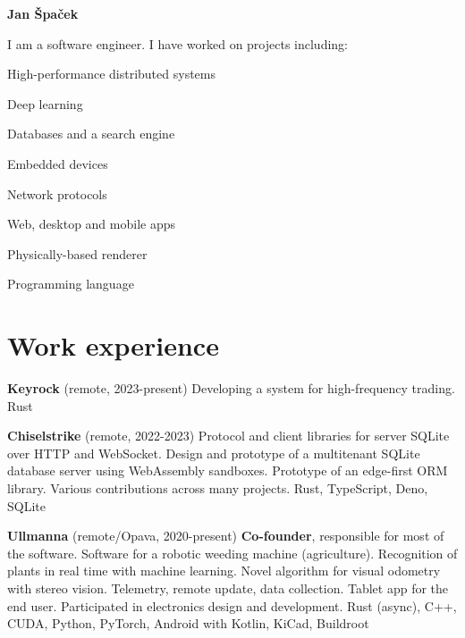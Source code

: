 \documentclass[10pt,a4paper]{article}
\begin{document}
\thispagestyle{empty}
\sffamily

{\bfseries\huge Jan Špaček}

\begin{multicols}{2}

I am a software engineer. I have worked on projects including:
\begin{compactitem}
  \item High-performance distributed systems
  \item Deep learning
  \item Databases and a search engine
  \item Embedded devices
  \item Network protocols
  \item Web, desktop and mobile apps
  \item Physically-based renderer
  \item Programming language
\end{compactitem}

\section*{Work experience}

\textbf{Keyrock} (remote, 2023-present)
  \newline Developing a system for high-frequency trading.
  \newline Rust

\textbf{Chiselstrike} (remote, 2022-2023)
  \newline Protocol and client libraries for server SQLite over HTTP and WebSocket.
  \newline Design and prototype of a multitenant SQLite database server using WebAssembly sandboxes.
  \newline Prototype of an edge-first ORM library.
  \newline Various contributions across many projects.
  \newline Rust, TypeScript, Deno, SQLite

\textbf{Ullmanna} (remote/Opava, 2020-present)
  \newline \textbf{Co-founder}, responsible for most of the software.
  \newline Software for a robotic weeding machine (agriculture).
  \newline Recognition of plants in real time with machine learning.
  \newline Novel algorithm for visual odometry with stereo vision.
  \newline Telemetry, remote update, data collection.
  \newline Tablet app for the end user.
  \newline Participated in electronics design and development.
  \newline Rust (async), C++, CUDA, Python, PyTorch, Android with Kotlin, KiCad, Buildroot


\end{multicols}
\end{document}
